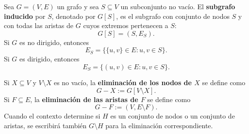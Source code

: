         \begin{definicion}
            Sea $G=(V,E)$ un grafo y sea $S\subseteq V$ un subconjunto no vacío. El \textbf{subgrafo inducido} por $S$, denotado por $G[S]$, es el subgrafo con conjunto de nodos $S$ y con todas las aristas de $G$ cuyos extremos pertenecen a $S$:
            \[
                G[S]=(S,E_S).
            \]
            Si $G$ es no dirigido, entonces
            \[
                E_S=\{\{u,v\}\in E:u,v\in S\}.
            \]
            Si $G$ es dirigido, entonces
            \[
                E_S=\{(u,v)\in E:u,v\in S\}.
            \]

            Si $X\subseteq V$ y $V\setminus X$ es no vacío, la \textbf{eliminación de los nodos de $X$} se define como
            \[
                G-X:=G[V\setminus X].
            \]
            Si $F\subseteq E$, la \textbf{eliminación de las aristas de $F$} se define como
            \[
                G-F:=(V,E\setminus F).
            \]
            Cuando el contexto determine si $H$ es un conjunto de nodos o un conjunto de aristas, se escribirá también $G\setminus H$ para la eliminación correspondiente.
        \end{definicion}

